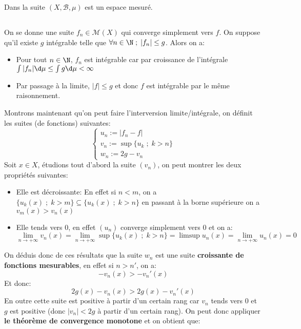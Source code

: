 \documentclass{report}
\begin{document}
   Dans la suite \((X, \mathscr{B}, \mu)\) est un espace mesuré.
   
   \subsection*{}
   On se donne une suite \(f_n \in \mathscr{M}(X)\) qui converge simplement vers \(f\). On suppose qu'il existe \(g\) intégrable telle que \(\forall n \in \N \; ; \; |f_n| \leq g\). Alors on a:
   \begin{itemize}
      \item Pour tout \(n\in \N\), \(f_n\) est intégrable car par croissance de l'intégrale \(\int |f_n| \d\mu \leq \int g \d\mu < \infty\)
      \item Par passage à la limite, \(|f| \leq g\) et donc \(f\) est intégrable par le même raisonnement.
   \end{itemize}
   Montrons maintenant qu'on peut faire l'interversion limite/intégrale, on définit les suites (de fonctions) suivantes:
   \[
      \begin{cases}
         u_n := |f_n - f|\\
         v_n := \sup\{u_k \; ; \; k > n\}\\
         w_n := 2g - v_n
      \end{cases}
   \]
   Soit \(x \in X\), étudions tout d'abord la suite \((v_n)\), on peut montrer les deux propriétés suivantes:
   \begin{itemize}
   \item Elle est décroissante:
   En effet si \(n < m\), on a \(\{u_k(x) \; ; \; k > m\} \subseteq \{u_k(x) \; ; \; k > n\}\) en passant à la borne supérieure on a \(v_m(x) > v_n(x)\)
   \item Elle tends vers 0, en effet \((u_n)\) converge simplement vers 0 et on a:
   \[
      \lim_{n \rightarrow +\infty} v_n(x) =  \lim_{n \rightarrow +\infty} \sup\{u_k(x) \; ; \; k > n\} = \limsup u_n(x) = \lim_{n \rightarrow +\infty} u_n(x) = 0
   \]
   \end{itemize}
   On déduis donc de ces résultats que la suite \(w_n\) est une suite \textbf{croissante de fonctions mesurables}, en effet si \(n > n'\), on a:
   \[
      -v_n(x) > -v_n'(x) 
   \]
   Et donc:
   \[
      2g(x) - v_n(x) > 2g(x) -v_n'(x) 
   \]
   En outre cette suite est positive à partir d'un certain rang car \(v_n\) tends vers 0 et \(g\) est positive (donc \(|v_n| < 2g\) à partir d'un certain rang). On peut donc appliquer \textbf{le théorème de convergence monotone} et on obtient que:
\end{document}
